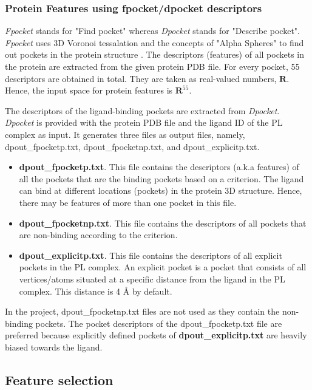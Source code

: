 \documentclass[11pt]{article}
\begin{document}
\subsubsection{Protein Features using fpocket/dpocket descriptors}
\textit{Fpocket} stands for "Find pocket" whereas \textit{Dpocket} stands for "Describe pocket"\cite{fpocketpaper}.
\textit{Fpocket} uses 3D Voronoi tessalation and the concepts of "Alpha Spheres" to find out pockets in the protein structure \cite{fpocketmanual} \cite{voronoitesselationshortvideo}.
The descriptors (features) of all pockets in the protein are extracted from the given protein PDB file.
For every pocket,  55 descriptors are obtained in total. They are taken as real-valued numbers, $\mathbf{R}$.
Hence, the input space for protein features is $\mathbf{R}^{55}$.


The descriptors of the ligand-binding pockets are extracted from \textit{Dpocket}.
\textit{Dpocket} is provided with the protein PDB file and the ligand ID of the PL complex as input.
It generates three files as output files,  namely,  dpout\_fpocketp.txt, dpout\_fpocketnp.txt,  and  dpout\_explicitp.txt.
\begin{itemize}
\item \textbf{dpout\_fpocketp.txt}.
This file contains the descriptors (a.k.a features) of all the pockets that are the binding pockets based on a criterion.
The ligand can bind at different locations (pockets) in the protein 3D structure.
Hence,  there may be features of more than one pocket in this file.
\item \textbf{dpout\_fpocketnp.txt}.  This file contains the descriptors of all pockets that are non-binding according to the criterion.
\item \textbf{dpout\_explicitp.txt}.  This file contains the descriptors of all explicit pockets in the PL complex. An explicit pocket is a pocket that consists of all vertices/atoms situated at a specific distance from the ligand in the PL complex.
This distance is 4 \r{A} by default. 
\end{itemize}

In the project,  dpout\_fpocketnp.txt files are not used as they contain the non-binding pockets.
The pocket descriptors of the dpout\_fpocketp.txt file are preferred because explicitly defined pockets of \textbf{dpout\_explicitp.txt} are heavily biased towards the ligand.

\subsection{Feature selection}
\end{document}
